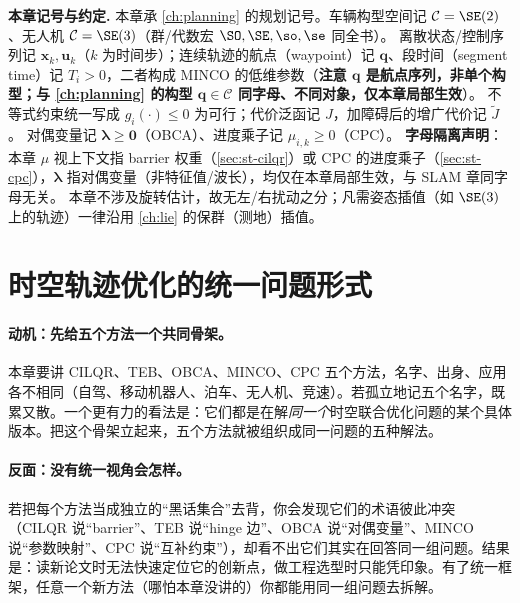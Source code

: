 \begin{note}
\textbf{本章记号与约定.}\;
本章承 \cref{ch:planning} 的规划记号。车辆构型空间记 $\mathcal C=\SE(2)$、无人机 $\mathcal C=\SE(3)$（群/代数宏 $\SO,\SE,\so,\se$ 同全书）。
离散状态/控制序列记 $\mathbf x_k,\mathbf u_k$（$k$ 为时间步）；连续轨迹的航点（waypoint）记 $\mathbf q$、段时间（segment time）记 $T_i>0$，二者构成 MINCO 的低维参数（\textbf{注意 $\mathbf q$ 是航点序列，非单个构型；与 \cref{ch:planning} 的构型 $\mathbf q\in\mathcal C$ 同字母、不同对象，仅本章局部生效}）。
不等式约束统一写成 $g_i(\cdot)\le 0$ 为可行；代价泛函记 $J$，加障碍后的增广代价记 $\tilde J$。
对偶变量记 $\boldsymbol\lambda\ge\mathbf 0$（OBCA）、进度乘子记 $\mu_{i,k}\ge 0$（CPC）。
\textbf{字母隔离声明}：本章 $\mu$ 视上下文指 barrier 权重（\cref{sec:st-cilqr}）或 CPC 的进度乘子（\cref{sec:st-cpc}），$\boldsymbol\lambda$ 指对偶变量（非特征值/波长），均仅在本章局部生效，与 SLAM 章同字母无关。
本章不涉及旋转估计，故无左/右扰动之分；凡需姿态插值（如 $\SE(3)$ 上的轨迹）一律沿用 \cref{ch:lie} 的保群（测地）插值。
\end{note}

\section{时空轨迹优化的统一问题形式}
\label{sec:st-unified}

\paragraph{动机：先给五个方法一个共同骨架。}
本章要讲 CILQR、TEB、OBCA、MINCO、CPC 五个方法，名字、出身、应用各不相同（自驾、移动机器人、泊车、无人机、竞速）。若孤立地记五个名字，既累又散。一个更有力的看法是：它们都是在解\emph{同一个}时空联合优化问题的某个具体版本。把这个骨架立起来，五个方法就被组织成同一问题的五种解法。

\paragraph{反面：没有统一视角会怎样。}
若把每个方法当成独立的“黑话集合”去背，你会发现它们的术语彼此冲突（CILQR 说“barrier”、TEB 说“hinge 边”、OBCA 说“对偶变量”、MINCO 说“参数映射”、CPC 说“互补约束”），却看不出它们其实在回答同一组问题。结果是：读新论文时无法快速定位它的创新点，做工程选型时只能凭印象。有了统一框架，任意一个新方法（哪怕本章没讲的）你都能用同一组问题去拆解。

